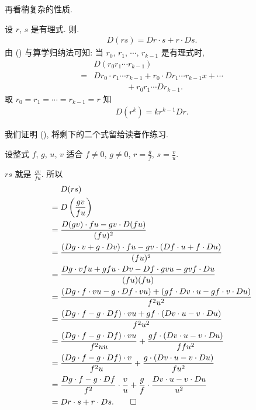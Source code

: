 再看稍复杂的性质.

\begin{proposition}
    设 $r$, $s$ 是有理式. 则.
    \begin{align*}
        D(rs) = Dr \cdot s + r \cdot Ds. \tag*{(\myStar)}
    \end{align*}
    由 (\myStar) 与算学归纳法可知: 当 $r_0$, $r_1$, $\cdots$, $r_{k-1}$ 是有理式时,
    \begin{align*}
             & D(r_0 r_1 \cdots r_{k-1})                                                \\
        = {} & Dr_0 \cdot r_1 \cdots r_{k-1} + r_0 \cdot Dr_1 \cdots r_{k-1} x + \cdots \\
             & \qquad \qquad + r_0 r_1 \cdots Dr_{k-1}.
    \end{align*}
    取 $r_0 = r_1 = \cdots = r_{k-1} = r$ 知
    \begin{align*}
        D(r^k) = kr^{k-1} Dr.
    \end{align*}
\end{proposition}

\begin{pf}
    我们证明 (\myStar), 将剩下的二个式留给读者作练习.

    设整式 $f$, $g$, $u$, $v$ 适合 $f \neq 0$, $g \neq 0$, $r = \frac{g}{f}$, $s = \frac{v}{u}$.

    $rs$ 就是 $\frac{gv}{fu}$. 所以
    \begin{align*}
             & D(rs)                                                                                                         \\
        = {} & D \left( \frac{gv}{fu} \right)                                                                                \\
        = {} & \frac{D(gv) \cdot fu - gv \cdot D(fu)}{(fu)^2}                                                                \\
        = {} & \frac{(Dg \cdot v + g \cdot Dv) \cdot fu - gv \cdot (Df \cdot u + f \cdot Du)}{(fu)^2}                        \\
        = {} & \frac{Dg \cdot vfu + gfu \cdot Dv - Df \cdot gvu - gvf \cdot Du}{(fu)(fu)}                                    \\
        = {} & \frac{(Dg \cdot f \cdot vu - g \cdot Df \cdot vu) + (gf \cdot Dv \cdot u - gf \cdot v \cdot Du)}{f^2 u^2}     \\
        = {} & \frac{(Dg \cdot f - g \cdot Df) \cdot vu + gf \cdot (Dv \cdot u - v \cdot Du)}{f^2 u^2}                       \\
        = {} & \frac{(Dg \cdot f - g \cdot Df) \cdot vu}{f^2 uu} + \frac{gf \cdot (Dv \cdot u - v \cdot Du)}{ff u^2}         \\
        = {} & \frac{(Dg \cdot f - g \cdot Df) \cdot v}{f^2 u} + \frac{g \cdot (Dv \cdot u - v \cdot Du)}{f u^2}             \\
        = {} & \frac{Dg \cdot f - g \cdot Df}{f^2} \cdot \frac{v}{u} + \frac{g}{f} \cdot \frac{Dv \cdot u - v \cdot Du}{u^2} \\
        = {} & Dr \cdot s + r \cdot Ds. \qedhere
    \end{align*}
\end{pf}

